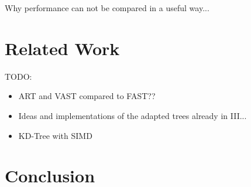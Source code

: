 \documentclass[conference]{IEEEtran}
\begin{document}
Why performance can not be compared in a useful way...

\section{Related Work}
TODO:
\begin{itemize}
	\item ART and VAST compared to FAST??
	\item Ideas and implementations of the adapted trees already in III...
	\item KD-Tree with SIMD
\end{itemize}

\section{Conclusion}
\end{document}
